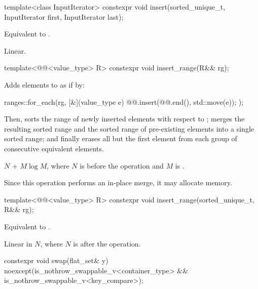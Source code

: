 %
\begin{itemdecl}
template<class InputIterator>
  constexpr void insert(sorted_unique_t, InputIterator first, InputIterator last);
\end{itemdecl}

\begin{itemdescr}
\pnum
\effects
Equivalent to .

\pnum
\complexity
Linear.
\end{itemdescr}

%
\begin{itemdecl}
template<@@<value_type> R>
  constexpr void insert_range(R&& rg);
\end{itemdecl}

\begin{itemdescr}
\pnum
\effects
Adds elements to  as if by:
\begin{codeblock}
ranges::for_each(rg, [&](value_type e) {
  @@.insert(@@.end(), std::move(e));
});
\end{codeblock}
Then,
sorts the range of newly inserted elements with respect to ;
merges the resulting sorted range and
the sorted range of pre-existing elements into a single sorted range; and
finally erases all but the first element
from each group of consecutive equivalent elements.

\pnum
\complexity
$N$ + $M \log M$, where $N$ is  before the operation and $M$
is .

\pnum
\remarks
Since this operation performs an in-place merge, it may allocate memory.
\end{itemdescr}

%
\begin{itemdecl}
template<@@<value_type> R>
  constexpr void insert_range(sorted_unique_t, R&& rg);
\end{itemdecl}

\begin{itemdescr}
\pnum
\effects
Equivalent to .

\pnum
\complexity
Linear in $N$, where $N$ is  after the operation.
\end{itemdescr}

%
\begin{itemdecl}
constexpr void swap(flat_set& y)
  noexcept(is_nothrow_swappable_v<container_type> &&
           is_nothrow_swappable_v<key_compare>);
\end{itemdecl}

